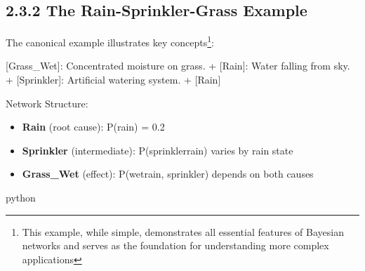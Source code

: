 \documentclass[
  11pt,
  letterpaper,
]{book}
\newenvironment{Shaded}{\begin{snugshade}}{\end{snugshade}}
\newcommand{\CommentTok}[1]{\textcolor[rgb]{0.37,0.37,0.37}{#1}}
\newcommand{\NormalTok}[1]{\textcolor[rgb]{0.00,0.23,0.31}{#1}}
\newcommand{\OtherTok}[1]{\textcolor[rgb]{0.00,0.23,0.31}{#1}}
\newcommand{\SpecialStringTok}[1]{\textcolor[rgb]{0.13,0.47,0.30}{#1}}
\providecommand{\tightlist}{%
  \setlength{\itemsep}{0pt}\setlength{\parskip}{0pt}}
\begin{document}
\subsection{2.3.2 The Rain-Sprinkler-Grass
Example}\label{the-rain-sprinkler-grass-example}

The canonical example illustrates key concepts\footnote{This example,
  while simple, demonstrates all essential features of Bayesian networks
  and serves as the foundation for understanding more complex
  applications}:

\begin{Shaded}
\begin{Highlighting}[]
\OtherTok{[Grass\_Wet]: }\NormalTok{Concentrated moisture on grass. }
\SpecialStringTok{ + }\CommentTok{[}\OtherTok{Rain}\CommentTok{]}\NormalTok{: Water falling from sky.}
\SpecialStringTok{ + }\CommentTok{[}\OtherTok{Sprinkler}\CommentTok{]}\NormalTok{: Artificial watering system.}
\SpecialStringTok{   + }\CommentTok{[}\OtherTok{Rain}\CommentTok{]}
\end{Highlighting}
\end{Shaded}

Network Structure:

\begin{itemize}
\tightlist
\item
  \textbf{Rain} (root cause): P(rain) = 0.2
\item
  \textbf{Sprinkler} (intermediate): P(sprinkler\textbar rain) varies by
  rain state
\item
  \textbf{Grass\_Wet} (effect): P(wet\textbar rain, sprinkler) depends
  on both causes
\end{itemize}

python
\end{document}
